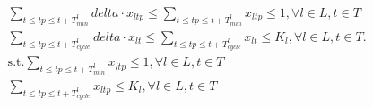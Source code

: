 \begin{align}
  & \sum_{t \leq tp \leq t + T_{m i n}^{l}} \mathit{delta} \cdot x_{l tp} \leq \sum_{t \leq tp \leq t + T_{m i n}^{l}} x_{l tp} \leq 1 , \forall l \in L , t \in T \tag{eq\_0025} \\
  & \sum_{t \leq tp \leq t + T_{c y c l e}^{l}} \mathit{delta} \cdot x_{l t} \leq \sum_{t \leq tp \leq t + T_{c y c l e}^{l}} x_{l t} \leq K_{l} , \forall l \in L , t \in T . \tag{eq\_0026} \\
  & \text{s}.\text{t}. \sum_{t \leq tp \leq t + T_{m i n}^{l}} x_{l tp} \leq 1 , \forall l \in L , t \in T \tag{eq\_0031} \\
  & \sum_{t \leq tp \leq t + T_{c y c l e}^{l}} x_{l tp} \leq K_{l} , \forall l \in L , t \in T \tag{eq\_0032} \\
\end{align}
